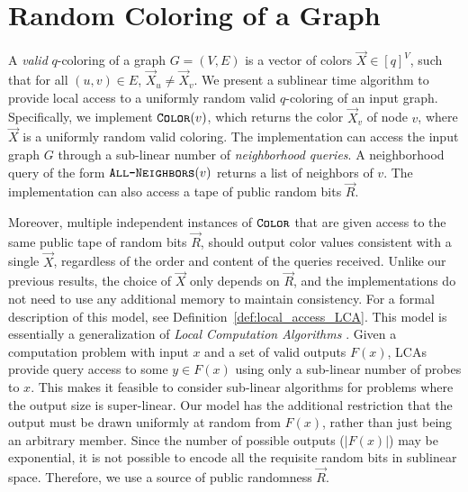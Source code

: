 \section{Random Coloring of a Graph}%
\label{sec:random_coloring_of_a_graph}
A \emph{valid} $q$-coloring of a graph $G=(V, E)$ is a vector of colors $\vec X \in [q]^V$, such that for all $(u,v)\in E$, $\vec X_u \not= \vec X_v$.
We present a sublinear time algorithm to provide local access to a uniformly random valid $q$-coloring of an input graph.
Specifically, we implement $\texttt{\textsc{Color}}(v)$, which returns the color $\vec X_v$ of node $v$, where $\vec X$ is a uniformly random valid coloring.
The implementation can access the input graph $G$ through a sub-linear number of \emph{neighborhood queries}.
A neighborhood query of the form $\texttt{\textsc{All-Neighbors}}(v)$ returns a list of neighbors of $v$.
The implementation can also access a tape of public random bits $\vec R$.

Moreover, multiple independent instances of $\texttt{\textsc{Color}}$ that are given access to the same public tape of random bits $\vec R$,
should output color values consistent with a single $\vec X$, regardless of the order and content of the queries received.
Unlike our previous results, the choice of $\vec X$ only depends on $\vec R$,
and the  implementations do not need to use any additional memory to maintain consistency.
For a formal description of this model, see Definition~\ref{def:local_access_LCA}.
This model is essentially a generalization of \emph{Local Computation Algorithms} \cite{LCA}.
Given a computation problem with input $x$ and a set of valid outputs $F(x)$,
LCAs provide query access to some $y\in F(x)$ using only a sub-linear number of probes to $x$.
This makes it feasible to consider sub-linear algorithms for problems where the output size is super-linear.
Our model has the additional restriction that the output must be drawn uniformly at random from $F(x)$, rather than just being an arbitrary member.
Since the number of possible outputs ($|F(x)|$) may be exponential, it is not possible to encode all the requisite random bits in sublinear space.
Therefore, we use a source of public randomness $\vec R$.

